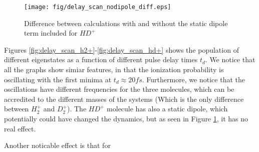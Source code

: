 \documentclass[a4paper]{article}
\begin{document}

\begin{figure}[p]
 \centering
 \texttt{[image: fig/delay\_scan\_nodipole\_diff.eps]}
 \caption{Difference between calculations with and without the static dipole term included for $HD^+$}
 \label{fig:delay_scan_hd+_nodipole_diff}
\end{figure}

Figures \ref{fig:delay_scan_h2+}-\ref{fig:delay_scan_hd+} shows the population of different eigenstates as a function of different pulse delay times $t_d$. We notice that all the graphs show simiar features, in that the ionization probability is oscillating with the first minima at $t_d \approx 20fs$. Furthermore, we notice that the oscillations have different frequencies for the three molecules, which can be accredited to the different masses of the systems (Which is the only difference between $H_2^+$ and $D_2^+$). The $HD^+$ molecule has also a static dipole, which potentially could have changed the dynamics, but as seen in Figure \ref{fig:delay_scan_hd+_nodipole_diff}, it has no real effect.

Another noticable effect is that for 
\end{document}
